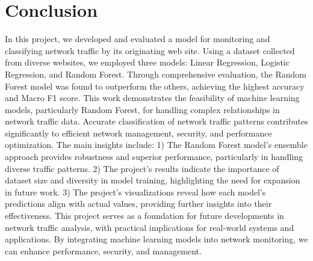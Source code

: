 \documentclass[10pt,sigconf,letterpaper,nonacm]{acmart}
\begin{document}
\section{Conclusion}
In this project, we developed and evaluated a model for monitoring and classifying network traffic by its originating web
site. Using a dataset collected from diverse websites, we employed three models: Linear Regression, Logistic Regression,
and Random Forest. Through comprehensive evaluation, the
Random Forest model was found to outperform the others,
achieving the highest accuracy and Macro F1 score.
This work demonstrates the feasibility of machine learning
models, particularly Random Forest, for handling complex relationships in network traffic data. Accurate classification of
network traffic patterns contributes significantly to efficient
network management, security, and performance optimization.
The main insights include: 1) The Random Forest model’s
ensemble approach provides robustness and superior performance, particularly in handling diverse traffic patterns.
2) The project’s results indicate the importance of dataset
size and diversity in model training, highlighting the need
for expansion in future work. 3) The project’s visualizations
reveal how each model’s predictions align with actual values,
providing further insights into their effectiveness.
This project serves as a foundation for future developments in network traffic analysis, with practical implications for real-world systems and applications. By integrating
machine learning models into network monitoring, we can
enhance performance, security, and management.


\end{document}
